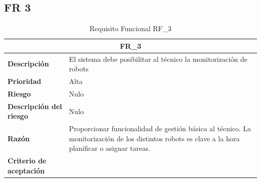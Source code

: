 \documentclass{scrreprt}
\begin{document}
\subsection{FR 3}
\begin{table}[H]
    \label{tab:my-table}
    
    \begin{tabular}{|p{5cm}|p{11cm}|}
    \hline
    \multicolumn{2}{|c|}{\textbf{FR_3}} \\
    \hline
    \textbf{Descripción  }                      & El sistema debe posibilitar al técnico la monitorización de robots                                                                            \\ \hline
    \textbf{Prioridad}                          & Alta                                                                                              \\ \hline
    \textbf{Riesgo}                          & Nulo                                                                                                \\ \hline
    \textbf{Descripción del riesgo}                    & Nulo                                                                               \\ \hline
    \textbf{Razón}                   & Proporcionar funcionalidad de gestión básica al técnico. La monitorización de los distintos robots es clave a la hora planificar o asignar tareas.                                                                                                \\ \hline
    \textbf{Criterio de aceptación}                    &   \\ \hline
    \end{tabular}%
    
    \caption{Requisito Funcional RF_3}
\end{table}
\end{document}

